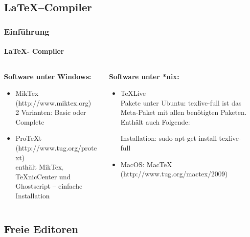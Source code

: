 \subsection{\LaTeX --Compiler}
\begin{frame}
\frametitle{Einf\"uhrung}
\framesubtitle{\LaTeX - Compiler}
\begin{columns}[t]
\begin{column}{.4\textwidth}
\textbf{Software unter Windows:}\\
\begin{itemize}
  \item MikTex (http://www.miktex.org)\\
   2 Varianten: Basic oder  Complete
  \item ProTeXt (http://www.tug.org/protext)\\
enthält MikTex, TeXnicCenter und Ghostscript – einfache Installation\\
\end{itemize}
\end{column}
\begin{column}{.6\textwidth}
\textbf{Software unter *nix:}
\begin{itemize}
  \item TeXLive\\
Pakete unter Ubuntu: {\ttfamily texlive-full} ist das Meta-Paket mit allen
ben\"otigten Paketen. Enthält auch Folgende:
Installation: {\ttfamily sudo apt-get install texlive-full}
\item MacOS: MacTeX (http://www.tug.org/mactex/2009)\\
\end{itemize}
\end{column}
\end{columns}
\end{frame}


\subsection{Freie Editoren}

